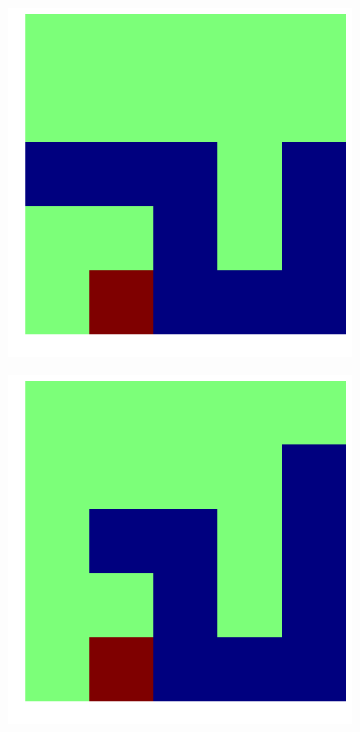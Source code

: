 \documentclass{article}
\begin{document}
\begin{figure}[!htpb]
\begin{subfigure}[b]{.19\linewidth}
  \end{subfigure}
   \begin{subfigure}[b]{.19\linewidth}
    \includegraphics[width=\linewidth]{snake_66.png}
  \end{subfigure}
  \begin{subfigure}[b]{.19\linewidth}
    \includegraphics[width=\linewidth]{snake_67.png}

\end{subfigure}
\end{figure}
\end{document}
